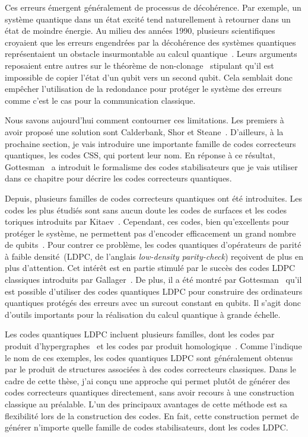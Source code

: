 Ces erreurs émergent généralement de processus de décohérence.
Par exemple,
un système quantique dans un état excité tend naturellement à retourner dans un état de moindre énergie.
Au milieu des années 1990,
plusieurs scientifiques croyaient que
les erreurs engendrées par la décohérence des systèmes quantiques
représentaient un obstacle insurmontable au calcul quantique~\cite{unruh_maintaining_1995, palma_quantum_1996, landauer_is_1995, chuang_quantum_1995}.
Leurs arguments reposaient entre autres sur le théorème de non-clonage~\cite{wootters_single_1982}
stipulant qu'il est impossible de copier l'état d'un qubit vers un second qubit.
Cela semblait donc empêcher l'utilisation de la redondance pour 
protéger le système des erreurs comme c'est le cas pour la communication classique.

Nous savons aujourd'hui comment contourner ces limitations. 
Les premiers à avoir proposé une solution sont Calderbank, Shor et Steane~\cite{calderbank_good_1996, steane_multiple-particle_nodate}.
D'ailleurs, à la prochaine section,
je vais introduire une importante famille de codes correcteurs quantiques, les codes CSS, qui portent leur nom.
En réponse à ce résultat, Gottesman~\cite{gottesman_stabilizer_1997} a introduit le formalisme des codes stabilisateurs
que je vais utiliser dans ce chapitre pour décrire les codes correcteurs quantiques.

Depuis,
plusieurs familles de codes correcteurs quantiques ont été introduites.
Les codes les plus étudiés sont sans aucun doute les codes de surfaces et 
les codes toriques introduits par Kitaev~\cite{kitaev_fault-tolerant_2003}.
Cependant,
ces codes, bien qu'excellents pour protéger le système,
ne permettent pas d'encoder efficacement un grand nombre de qubits~\cite{bravyi_tradeoffs_2010}.
Pour contrer ce problème,
les codes quantiques d'opérateurs de parité à faible 
densité~(LDPC, de l'anglais \textit{low-density parity-check})
reçoivent de plus en plus d'attention.
Cet intérêt est en partie stimulé par le succès des codes LDPC classiques introduits
par Gallager~\cite{gallager_low-density_1962}.
De plus, il a été montré par Gottesman~\cite{gottesman_fault-tolerant_2013}
qu'il est possible d'utiliser des codes quantiques LDPC pour 
construire des ordinateurs quantiques protégés des erreurs avec 
un surcout constant en qubits.
Il s'agit donc d'outils importants pour la réalisation du calcul quantique à grande échelle.

Les codes quantiques LDPC incluent plusieurs familles,
dont les codes par produit d'hypergraphes~\cite{tillich_quantum_2014}
et les codes par produit homologique~\cite{bravyi_homological_2014}.
Comme l'indique le nom de ces exemples,
les codes quantiques LDPC sont généralement obtenus par le produit 
de structures associées à des codes correcteurs classiques.
Dans le cadre de cette thèse,
j'ai conçu une approche qui permet plutôt de générer des codes correcteurs quantiques
directement,
sans avoir recours à une construction classique au préalable.
L'un des principaux avantages de cette méthode est sa flexibilité 
lors de la construction des codes.
En fait,
cette construction permet de générer n'importe quelle famille de codes stabilisateurs,
dont les codes LDPC.

